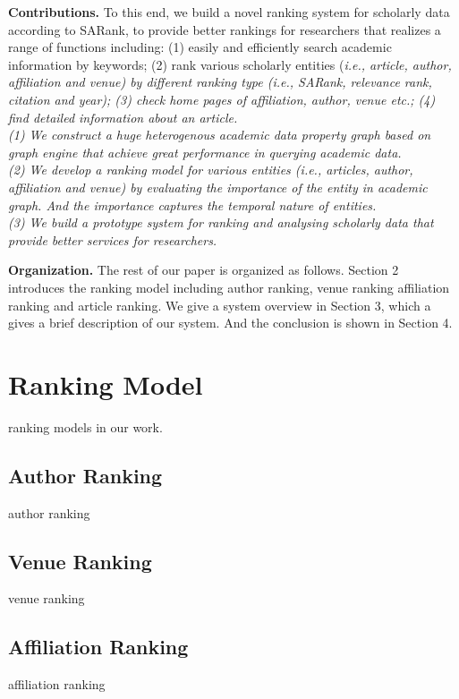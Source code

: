 \documentclass[conference]{IEEEtran}
\begin{document}
\par
\textbf{Contributions.}
To this end, we build a novel ranking system for scholarly data according to SARank, to provide better rankings for researchers that realizes a range of functions including: (1) easily and efficiently search academic information by keywords; (2) rank various scholarly entities (\itshape i.e., \upshape article, author, affiliation and venue) by different ranking type (\itshape i.e., \upshape SARank, relevance rank, citation and year); (3) check home pages of affiliation, author, venue  \itshape etc.; \upshape (4) find detailed information about an article.\\
(1) We construct a huge heterogenous academic data property graph based on graph engine that achieve great performance in querying academic data. \\
(2) We develop a ranking model for various entities (\itshape i.e., \upshape articles, author, affiliation and venue) by evaluating the importance of the entity in academic graph. And the importance captures the temporal nature of entities. \\
(3) We build a prototype system for ranking and analysing scholarly data that provide better services for researchers.

\par
\textbf{Organization.}
The rest of our paper is organized as follows. Section 2 introduces the ranking model including author ranking, venue ranking affiliation ranking and article ranking. We give a system overview in Section 3, which a gives a brief description of our system. And the conclusion is shown in Section 4.


\section{Ranking Model}
ranking models in our work.

\subsection{Author Ranking}
 author ranking

\subsection{Venue Ranking}
venue ranking

\subsection{Affiliation Ranking}
affiliation ranking
\end{document}
